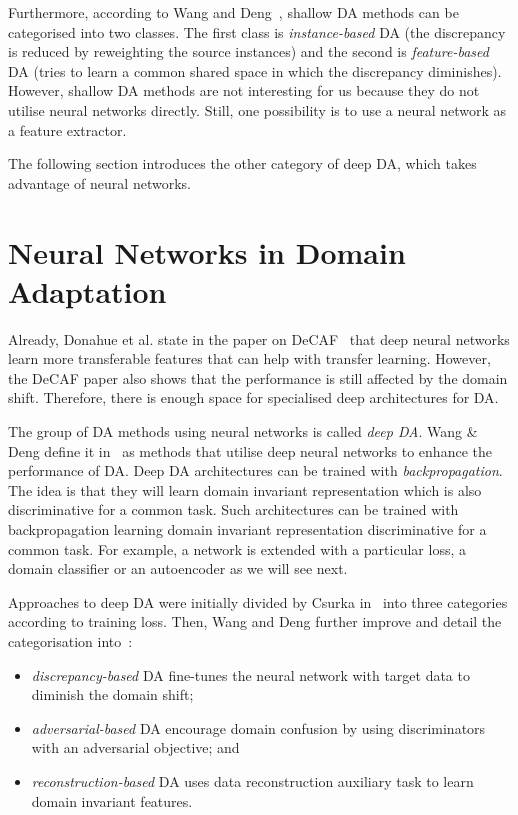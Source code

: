 Furthermore, according to Wang and Deng~\cite{wang2018},
shallow DA methods can be categorised into two classes.
The first class is \textit{instance-based} DA
(the discrepancy is reduced by reweighting the source instances)
and the second is \textit{feature-based} DA
(tries to learn a common shared space in which the discrepancy diminishes).
However, shallow DA methods are not interesting for us
because they do not utilise neural networks directly.
Still, one possibility is to use a neural network as a feature extractor.~\cite{csurka2017}

The following section introduces the other category of deep DA,
which takes advantage of neural networks.

\section{Neural Networks in Domain Adaptation}

Already, Donahue et al. state in the paper on DeCAF~\cite{donahue2014}
that deep neural networks learn more transferable features
that can help with transfer learning.
However, the DeCAF paper also shows
that the performance is still affected by the domain shift.
Therefore, there is enough space for specialised deep architectures for DA.

The group of DA methods using neural networks is called \textit{deep DA}.
Wang \& Deng define it in~\cite{wang2018} as methods that utilise deep neural networks to enhance the performance of DA.
Deep DA architectures can be trained with \textit{backpropagation}.
The idea is that they will learn domain invariant representation
which is also discriminative for a common task.
Such architectures can be trained with backpropagation
learning domain invariant representation discriminative for a common task.
For example, a network is extended with a particular loss, a domain classifier or an autoencoder as we will see next.

Approaches to deep DA were initially divided by Csurka in~\cite{csurka2017} into three categories according to training loss.
Then, Wang and Deng further improve and detail the categorisation into~\cite{wang2018}:

\begin{itemize}
	\item \textit{discrepancy-based} DA fine-tunes the neural network
		with target data to diminish the domain shift;
	\item \textit{adversarial-based} DA encourage domain confusion
		by using discriminators with an adversarial objective; and
	\item \textit{reconstruction-based} DA uses data reconstruction auxiliary task to learn domain invariant features.
\end{itemize}

